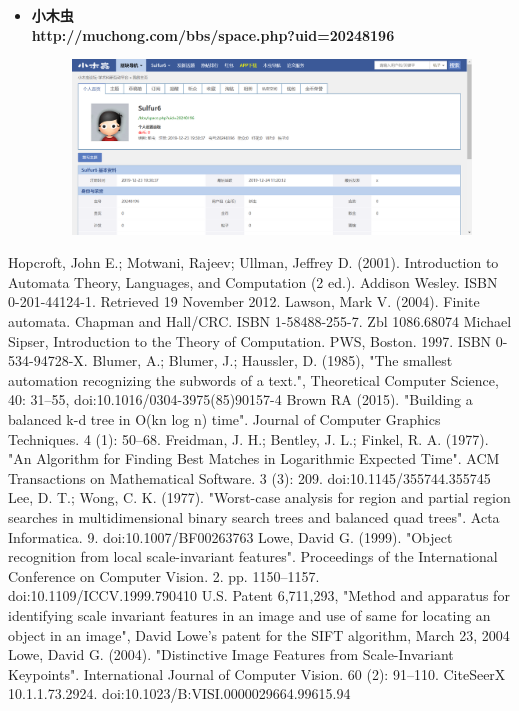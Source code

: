 \documentclass{article}
\begin{document}
\begin{itemize}
{\begin{figure}[h]
            \label{fig:cnblogs}
        \end{figure} 
    }
\newpage
    \item {
        \bf{小木虫}\\
        http://muchong.com/bbs/space.php?uid=20248196\\
        \begin{figure}[h]
            \centering
            \includegraphics[scale=0.4]{xmc}
            \label{fig:xmc}
        \end{figure}  
    }
\end{itemize}

\newpage



\begin{thebibliography}{99}  
    Hopcroft, John E.; Motwani, Rajeev; Ullman, Jeffrey D. (2001). Introduction to Automata Theory, Languages, and Computation (2 ed.). Addison Wesley. ISBN 0-201-44124-1. Retrieved 19 November 2012.
    Lawson, Mark V. (2004). Finite automata. Chapman and Hall/CRC. ISBN 1-58488-255-7. Zbl 1086.68074
    Michael Sipser, Introduction to the Theory of Computation. PWS, Boston. 1997. ISBN 0-534-94728-X.
    Blumer, A.; Blumer, J.; Haussler, D. (1985), "The smallest automation recognizing the subwords of a text.", Theoretical Computer Science, 40: 31–55, doi:10.1016/0304-3975(85)90157-4
    Brown RA (2015). "Building a balanced k-d tree in O(kn log n) time". Journal of Computer Graphics Techniques. 4 (1): 50–68.
    Freidman, J. H.; Bentley, J. L.; Finkel, R. A. (1977). "An Algorithm for Finding Best Matches in Logarithmic Expected Time". ACM Transactions on Mathematical Software. 3 (3): 209. doi:10.1145/355744.355745
    Lee, D. T.; Wong, C. K. (1977). "Worst-case analysis for region and partial region searches in multidimensional binary search trees and balanced quad trees". Acta Informatica. 9. doi:10.1007/BF00263763
    Lowe, David G. (1999). "Object recognition from local scale-invariant features". Proceedings of the International Conference on Computer Vision. 2. pp. 1150–1157. doi:10.1109/ICCV.1999.790410
    U.S. Patent 6,711,293, "Method and apparatus for identifying scale invariant features in an image and use of same for locating an object in an image", David Lowe's patent for the SIFT algorithm, March 23, 2004
    Lowe, David G. (2004). "Distinctive Image Features from Scale-Invariant Keypoints". International Journal of Computer Vision. 60 (2): 91–110. CiteSeerX 10.1.1.73.2924. doi:10.1023/B:VISI.0000029664.99615.94
\end{thebibliography}
\end{document}
